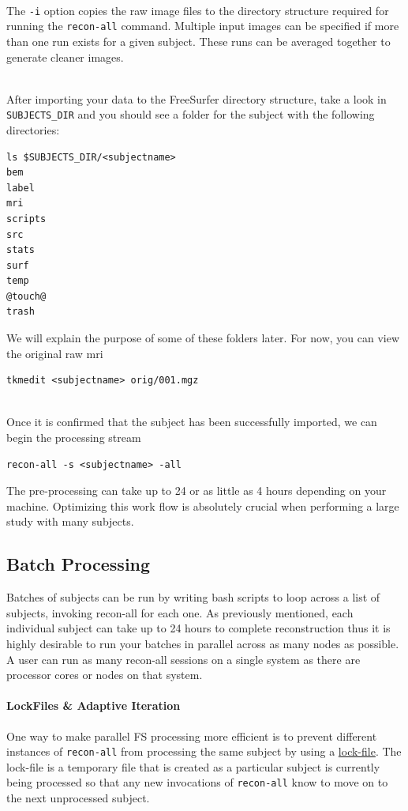 \documentclass[paper=a4, fontsize=11pt]{scrartcl} %
\numberwithin{equation}{section} %
\numberwithin{figure}{section} %
\numberwithin{table}{section} %
\begin{document}
~\\The \texttt{-i} option copies the raw image files to the directory structure required for running the \texttt{recon-all} command.  Multiple input images can be specified if more than one run exists for a given subject.  These runs can be averaged together to generate cleaner images.

~\\After importing your data to the FreeSurfer directory structure, take a look in \texttt{SUBJECTS\_DIR} and you should see a folder for the subject with the following directories:
\begin{lstlisting}[frame=single]
ls $SUBJECTS_DIR/<subjectname>
bem
label
mri
scripts
src
stats
surf
temp
@touch@
trash
\end{lstlisting}
We will explain the purpose of some of these folders later.  For now, you can view the original raw mri
\begin{lstlisting}[frame=single]
tkmedit <subjectname> orig/001.mgz
\end{lstlisting}
~\\
Once it is confirmed that the subject has been successfully imported, we can begin the processing stream
\begin{lstlisting}[frame=single]
recon-all -s <subjectname> -all
\end{lstlisting}

The pre-processing can take up to 24 or as little as 4 hours depending on your machine.  Optimizing this work flow is absolutely crucial when performing a large study with many subjects.
\subsection{Batch Processing}
Batches of subjects can be run by writing bash scripts to loop across a list of subjects, invoking recon-all for each one.  As previously mentioned, each individual subject can take up to 24 hours to complete reconstruction thus it is highly desirable to run your batches in parallel across as many nodes as possible.  A user can run as many recon-all sessions on a single system as there are processor cores or nodes on that system.  
\paragraph{LockFiles \& Adaptive Iteration} One way to make parallel FS processing more efficient is to prevent different instances of \texttt{recon-all} from processing the same subject by using a \href{http://docstore.mik.ua/orelly/unix3/upt/ch36_27.htm}{lock-file}.  The lock-file is a temporary file that is created as a particular subject is currently being processed so that any new invocations of \texttt{recon-all} know to move on to the next unprocessed subject.  
\end{document}
